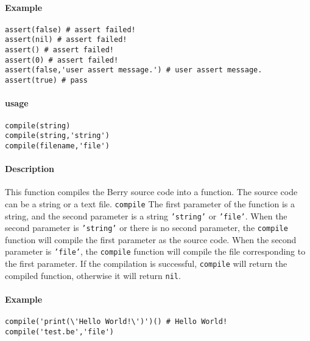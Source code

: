 \paragraph{Example}
\begin{lstlisting}[language=berry, numbers=none]
assert(false) # assert failed!
assert(nil) # assert failed!
assert() # assert failed!
assert(0) # assert failed!
assert(false,'user assert message.') # user assert message.
assert(true) # pass
\end{lstlisting}


\paragraph{usage}
\begin{lstlisting}[language=berry, numbers=none]
compile(string)
compile(string,'string')
compile(filename,'file')
\end{lstlisting}

\paragraph{Description}
This function compiles the Berry source code into a function. The source code can be a string or a text file. \texttt{compile} The first parameter of the function is a string, and the second parameter is a string \texttt{'string'} or \texttt{'file'}. When the second parameter is \texttt{'string'} or there is no second parameter, the \texttt{compile} function will compile the first parameter as the source code. When the second parameter is \texttt{'file'}, the \texttt{compile} function will compile the file corresponding to the first parameter. If the compilation is successful, \texttt{compile} will return the compiled function, otherwise it will return \texttt{nil}.

\paragraph{Example}
\begin{lstlisting}[language=berry, numbers=none]
compile('print(\'Hello World!\')')() # Hello World!
compile('test.be','file')
\end{lstlisting}


